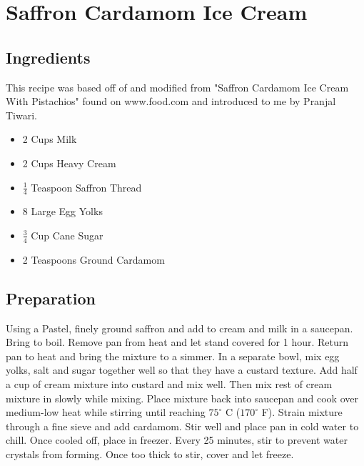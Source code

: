 \thispagestyle{fancy}
\section{Saffron Cardamom Ice Cream}
\AddToShipoutPicture*{\SaffronIceCream}

\subsection*{Ingredients}
This recipe was based off of and modified from "Saffron Cardamom Ice Cream With Pistachios" found on www.food.com and introduced to me by Pranjal Tiwari.
\begin{multicols}{3}
	\begin{itemize}
		\item 2 Cups Milk
		\item 2 Cups Heavy Cream
		\item $\frac{1}{4}$ Teaspoon Saffron Thread
		\item 8 Large Egg Yolks
		\item $\frac{3}{4}$ Cup Cane Sugar
		\item 2 Teaspoons Ground Cardamom
	\end{itemize}
\end{multicols}

\subsection*{Preparation}

Using a Pastel, finely ground saffron and add to cream and milk in a saucepan. Bring to boil. Remove pan from heat and let stand covered for 1 hour. Return pan to heat and bring the mixture to a simmer. In a separate bowl, mix egg yolks, salt and sugar together well so that they have a custard texture. Add half a cup of cream mixture into custard and mix well. Then mix rest of cream mixture in slowly while mixing. Place mixture back into saucepan and cook over medium-low heat while stirring until reaching $75^\circ$ C ($170^\circ$ F). Strain mixture through a fine sieve and add cardamom. Stir well and place pan in cold water to chill. Once cooled off, place in freezer. Every 25 minutes, stir to prevent water crystals from forming. Once too thick to stir, cover and let freeze.